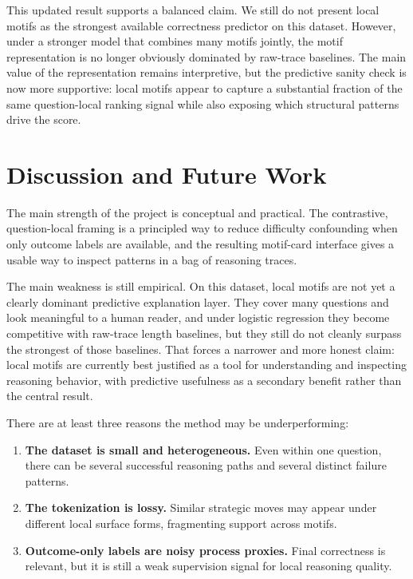 \documentclass[11pt]{article}
\begin{document}
This updated result supports a balanced claim. We still do not present local motifs as the strongest available correctness predictor on this dataset. However, under a stronger model that combines many motifs jointly, the motif representation is no longer obviously dominated by raw-trace baselines. The main value of the representation remains interpretive, but the predictive sanity check is now more supportive: local motifs appear to capture a substantial fraction of the same question-local ranking signal while also exposing which structural patterns drive the score.

\section{Discussion and Future Work}

The main strength of the project is conceptual and practical. The contrastive, question-local framing is a principled way to reduce difficulty confounding when only outcome labels are available, and the resulting motif-card interface gives a usable way to inspect patterns in a bag of reasoning traces.

The main weakness is still empirical. On this dataset, local motifs are not yet a clearly dominant predictive explanation layer. They cover many questions and look meaningful to a human reader, and under logistic regression they become competitive with raw-trace length baselines, but they still do not cleanly surpass the strongest of those baselines. That forces a narrower and more honest claim: local motifs are currently best justified as a tool for understanding and inspecting reasoning behavior, with predictive usefulness as a secondary benefit rather than the central result.

There are at least three reasons the method may be underperforming:
\begin{enumerate}[leftmargin=*]
\item \textbf{The dataset is small and heterogeneous.} Even within one question, there can be several successful reasoning paths and several distinct failure patterns.
\item \textbf{The tokenization is lossy.} Similar strategic moves may appear under different local surface forms, fragmenting support across motifs.
\item \textbf{Outcome-only labels are noisy process proxies.} Final correctness is relevant, but it is still a weak supervision signal for local reasoning quality.
\end{enumerate}
\end{document}
